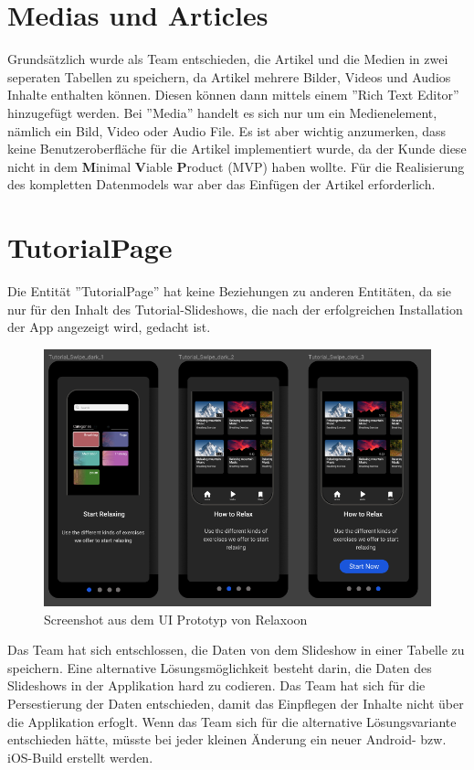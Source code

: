 \section{Medias und Articles}

Grundsätzlich wurde als Team entschieden,
die Artikel und die Medien in zwei seperaten Tabellen zu speichern,
da Artikel mehrere Bilder, Videos und Audios Inhalte enthalten können.
Diesen können dann mittels einem ''Rich Text Editor'' hinzugefügt werden.
Bei ''Media'' handelt es sich nur um ein Medienelement,
nämlich ein Bild, Video oder Audio File. Es ist aber wichtig anzumerken,
dass keine Benutzeroberfläche für die Artikel implementiert wurde, da der Kunde
diese nicht in dem \textbf{M}inimal \textbf{V}iable \textbf{P}roduct (MVP) haben wollte.
Für die Realisierung des kompletten Datenmodels war aber das Einfügen der Artikel erforderlich.

\section{TutorialPage}
\label{Tutorial-Page}
Die Entität ''TutorialPage'' hat keine Beziehungen zu anderen Entitäten, da sie nur für den Inhalt des Tutorial-Slideshows,
die nach der erfolgreichen Installation der App angezeigt wird, gedacht ist.

\begin{figure}[H]
  \centering
  \includegraphics[height=0.5\textwidth]{./pics/slideshow.png}
  \caption{Screenshot aus dem UI Prototyp von Relaxoon}
\end{figure}

Das Team hat sich entschlossen, die Daten von dem Slideshow in einer Tabelle zu speichern.
Eine alternative Lösungsmöglichkeit besteht darin, die Daten des Slideshows in der Applikation hard zu codieren.
Das Team hat sich für die Persestierung der Daten entschieden, damit das Einpflegen der Inhalte nicht über die Applikation erfoglt.
Wenn das Team sich für die alternative Lösungsvariante entschieden hätte, müsste bei jeder kleinen Änderung ein neuer Android- bzw. iOS-Build erstellt werden.

